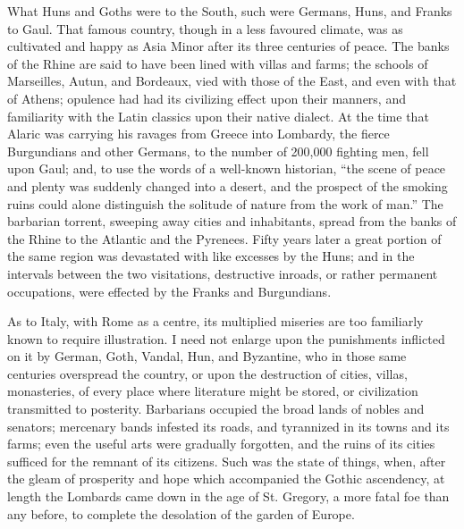 What Huns and Goths were to the South, such were Germans, Huns, and
Franks to Gaul. That famous country, though in a less favoured
climate, was as cultivated and happy as Asia Minor after its three
centuries of peace. The banks of the Rhine are said to have been lined
with villas and farms; the schools of Marseilles, Autun, and Bordeaux,
vied with those of the East, and even with that of Athens; opulence
had had its civilizing effect upon their manners, and familiarity with
the Latin classics upon their native dialect. At the time that Alaric
was carrying his ravages from Greece into Lombardy, the fierce
Burgundians and other Germans, to the number of 200,000 fighting men,
fell upon Gaul; and, to use the words of a well-known historian,
``the scene of peace and plenty was suddenly changed into a
desert, and the prospect of the smoking ruins could alone distinguish
the solitude of nature from the work of man.'' The barbarian
torrent, sweeping away cities and inhabitants, spread from the banks
of the Rhine to the Atlantic and the Pyrenees. Fifty years later a
great portion of the same region was devastated with like excesses by
the Huns; and in the intervals between the two visitations,
destructive inroads, or rather permanent occupations, were effected by
the Franks and Burgundians.

As to Italy, with Rome as a centre, its multiplied miseries
are too familiarly known to require illustration. I need not enlarge
upon the punishments inflicted on it by German, Goth, Vandal, Hun, and
Byzantine, who in those same centuries overspread the country, or upon
the destruction of cities, villas, monasteries, of every place where
literature might be stored, or civilization transmitted to posterity.
Barbarians occupied the broad lands of nobles and senators; mercenary
bands infested its roads, and tyrannized in its towns and its farms;
even the useful arts were gradually forgotten, and the ruins of its
cities sufficed for the remnant of its citizens. Such was the state of
things, when, after the gleam of prosperity and hope which accompanied
the Gothic ascendency, at length the Lombards came down in the age of
St. Gregory, a more fatal foe than any before, to complete the
desolation of the garden of Europe.

